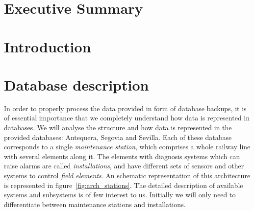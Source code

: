 \documentclass[a4paper,12pt]{article}
\begin{document}
\newcommand\litem[1]{\item{\bfseries #1 }}
\renewcommand{\arraystretch}{1.5} %

\newcommand\HeadCell[1]{%
  \multicolumn{1}{c|}{\cellcolor{MidnightBlue}\bfseries\sffamily\textcolor{white}{#1}}
}

%

\onehalfspacing



\section*{Executive Summary}


\newpage
\tableofcontents %
\cleardoublepage
{} %
\listoffigures %

\cleardoublepage
{} %
\listoftables %
\cleardoublepage

\setcounter{page}{1}
\section{Introduction}\label{sec:context}



\section{Database description}\label{sec:database_description}
In order to properly process the data provided in form of database backups, it is of essential importance that we completely understand how data is represented in databases. We will analyse the structure and how data is represented in the provided databases: Antequera, Segovia and Sevilla. Each of these database corresponds to a single \emph{maintenance station}, which comprises a whole railway line with several elements along it. The elements with diagnosis systems which can raise alarms are called \emph{installations}, and have different sets of sensors and other systems to control \emph{field elements}. An schematic representation of this architecture is represented in figure~\ref{fig:arch_stations}. The detailed description of available systems and subsystems is of few interest to us. Initially we will only need to differentiate between maintenance stations and installations.
\end{document}
